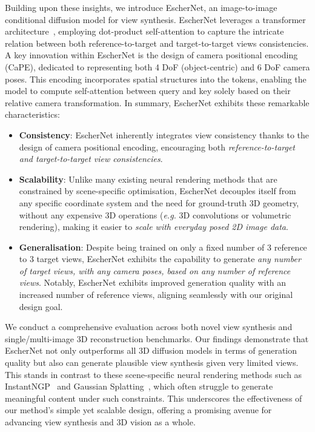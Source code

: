 \documentclass[10pt,twocolumn,letterpaper]{article}
\begin{document}
Building upon these insights, we introduce EscherNet, an image-to-image conditional diffusion model for view synthesis. EscherNet leverages a transformer architecture~\cite{vaswani2017transformer}, employing dot-product self-attention to capture the intricate relation between both reference-to-target and target-to-target views consistencies. A key innovation within EscherNet is the design of camera positional encoding (CaPE), dedicated to representing both 4 DoF (object-centric) and 6 DoF camera poses. This encoding incorporates spatial structures into the tokens, enabling the model to compute self-attention between query and key solely based on their relative camera transformation. In summary, EscherNet exhibits these remarkable characteristics:
\begin{itemize}
    \item {\bf Consistency}: EscherNet inherently integrates view consistency thanks to the design of camera positional encoding, encouraging both {\it reference-to-target and target-to-target view consistencies}.
      \item {\bf Scalability}: Unlike many existing neural rendering methods that are constrained by scene-specific optimisation, EscherNet decouples itself from any specific coordinate system and the need for ground-truth 3D geometry, without any expensive 3D operations ({\it e.g.} 3D convolutions or volumetric rendering), making it easier to {\it scale with everyday posed 2D image data}.
    \item {\bf Generalisation}: Despite being trained on only a fixed number of 3 reference to 3 target views, EscherNet exhibits the capability to generate {\it any number of target views, with any camera poses, based on any number of reference views}. Notably, EscherNet exhibits improved generation quality with an increased number of reference views, aligning seamlessly with our original design goal.
\end{itemize}

We conduct a comprehensive evaluation across both novel view synthesis and single/multi-image 3D reconstruction benchmarks. Our findings demonstrate that EscherNet not only outperforms all 3D diffusion models in terms of generation quality but also can generate plausible view synthesis given very limited views. This stands in contrast to these scene-specific neural rendering methods such as InstantNGP~\cite{muller2022instant} and Gaussian Splatting~\cite{kerbl20233gaussian}, which often struggle to generate meaningful content under such constraints. This underscores the effectiveness of our method's simple yet scalable design, offering a promising avenue for advancing view synthesis and 3D vision as a whole.
\end{document}
